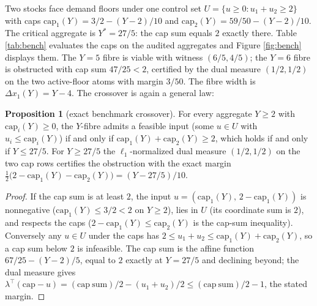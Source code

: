 \documentclass[10pt,twocolumn]{article}
\theoremstyle{definition}
\newtheorem{proposition}{Proposition}
\begin{document}
Two stocks face demand floors under one control set
\(U = \{u \ge 0 : u_1 + u_2 \ge 2\}\) with caps
\(\mathrm{cap}_1(Y) = 3/2 - (Y - 2)/10\) and
\(\mathrm{cap}_2(Y) = 59/50 - (Y - 2)/10\). The critical aggregate is
\(Y^{*} = 27/5\): the cap sum equals \(2\) exactly there. Table
\ref{tab:bench} evaluates the caps on the audited aggregates and Figure
\ref{fig:bench} displays them. The \(Y = 5\) fibre is viable with
witness \((6/5, 4/5)\); the \(Y = 6\) fibre is obstructed with cap sum
\(47/25 < 2\), certified by the dual measure \((1/2, 1/2)\) on the two
active-floor atoms with margin \(3/50\). The fibre width is
\(\Delta x_1(Y) = Y - 4\). The crossover is again a general law:

\begin{proposition}[exact benchmark crossover]\label{prop:bench}
For every aggregate \(Y \ge 2\) with \(\mathrm{cap}_i(Y) \ge 0\), the
\(Y\)-fibre admits a feasible input (some \(u \in U\) with
\(u_i \le \mathrm{cap}_i(Y)\)) if and only if
\(\mathrm{cap}_1(Y) + \mathrm{cap}_2(Y) \ge 2\), which holds if and
only if \(Y \le 27/5\). For \(Y \ge 27/5\) the
\(\ell_1\)-normalized dual measure \((1/2, 1/2)\) on the two cap rows
certifies the obstruction with the exact margin
\(\tfrac12\bigl(2 - \mathrm{cap}_1(Y) - \mathrm{cap}_2(Y)\bigr) =
(Y - 27/5)/10\).
\end{proposition}

\begin{proof}
If the cap sum is at least \(2\), the input
\(u = (\mathrm{cap}_1(Y),\, 2 - \mathrm{cap}_1(Y))\) is nonnegative
(\(\mathrm{cap}_1(Y) \le 3/2 < 2\) on \(Y \ge 2\)), lies in
\(U\) (its coordinate sum is \(2\)), and respects the caps
(\(2 - \mathrm{cap}_1(Y) \le \mathrm{cap}_2(Y)\) is the cap-sum
inequality). Conversely any \(u \in U\) under the caps has
\(2 \le u_1 + u_2 \le \mathrm{cap}_1(Y) + \mathrm{cap}_2(Y)\), so a
cap sum below \(2\) is infeasible. The cap sum is the affine function
\(67/25 - (Y - 2)/5\), equal to \(2\) exactly at \(Y = 27/5\) and
declining beyond; the dual measure gives
\(\lambda^\top(\mathrm{cap} - u) = (\mathrm{cap\ sum})/2 -
(u_1 + u_2)/2 \le (\mathrm{cap\ sum})/2 - 1\), the stated margin.
\end{proof}
\end{document}
